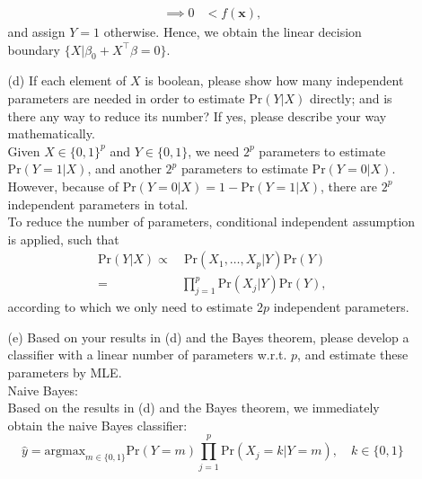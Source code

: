 \documentclass[10pt]{article}
\begin{document}
\begin{enumerate}[1.]
\begin{itemize}
{\begin{align*}
                        \implies 0 & < f(\boldsymbol{{x}}),
                    \end{align*}
                    and assign $Y = 1$ otherwise.
                    Hence, we obtain the linear decision boundary $\{ X | \beta_0 + X^\top \beta = 0 \}$.
                    }
              \item[(d)] If each element of $X$ is boolean, please show how many independent parameters are needed in order to estimate $\text{Pr}(Y|X)$ directly;
                    and is there any way to reduce its number? If yes, please describe your way mathematically. ~  \\
                    {\color{blue}
                    Given $X \in \{0,1\}^p$ and $Y \in \{ 0,1\}$, we need $2^p$ parameters to estimate $\text{Pr}(Y=1|X)$,
                    and another $2^p$ parameters to estimate $\text{Pr}(Y=0|X)$.
                    However, because of $\text{Pr}(Y=0|X) = 1 - \text{Pr}(Y=1|X)$,
                    there are $2^p$ independent parameters in total. \\
                    To reduce the number of parameters, conditional independent assumption is
                    applied, such that
                    \begin{align*}
                        \text{Pr}(Y|X) \propto & \ \text{Pr}(X_1, \ldots, X_p | Y) \text{Pr}(Y) \\
                        =                      & \prod_{j=1}^{p}\text{Pr}(X_j|Y) \text{Pr}(Y),
                    \end{align*}
                    according to which we only need to estimate $2p$ independent parameters.
                    }
              \item[(e)] Based on your results in (d) and the Bayes theorem, please develop a classifier with a linear number of parameters w.r.t. $p$,
                    and estimate these parameters by MLE. ~ \\
                    {\color{blue}
                    Naive Bayes: \\
                    Based on the results in (d) and the Bayes theorem,
                    we immediately obtain the naive Bayes classifier:
                    \begin{equation*}
                        \hat{y} = \text{argmax}_{m \in \{0,1\}} \text{Pr}(Y=m)\prod_{j=1}^p \text{Pr}\left(X_j=k| Y=m\right), \quad k\in \{ 0,1\}
                    \end{equation*}
}
\end{itemize}
\end{enumerate}
\end{document}
